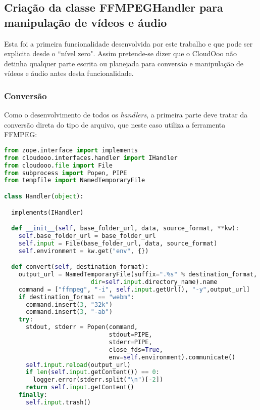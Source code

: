 \subsection{Criação da classe FFMPEGHandler para manipulação de vídeos e áudio}

Esta foi a primeira funcionalidade desenvolvida por este trabalho e que pode ser explicita desde o ``nível zero".
Assim pretende-se dizer que o CloudOoo não detinha qualquer parte escrita ou planejada para conversão e manipulação de vídeos e áudio antes desta funcionalidade.

\subsubsection{Conversão}

Como o desenvolvimento de todos os \textit{handlers}, a primeira parte deve tratar da conversão direta do tipo de arquivo, que neste caso utiliza a ferramenta FFMPEG:

{\singlespace
\begin{lstlisting}[caption=Conversão do FFMPEGHandler,language=python,label={ffhand}]
from zope.interface import implements
from cloudooo.interfaces.handler import IHandler
from cloudooo.file import File
from subprocess import Popen, PIPE
from tempfile import NamedTemporaryFile

class Handler(object):

  implements(IHandler)

  def __init__(self, base_folder_url, data, source_format, **kw):
    self.base_folder_url = base_folder_url
    self.input = File(base_folder_url, data, source_format)
    self.environment = kw.get("env", {})

  def convert(self, destination_format):
    output_url = NamedTemporaryFile(suffix=".%s" % destination_format,
                        dir=self.input.directory_name).name
    command = ["ffmpeg", "-i", self.input.getUrl(), "-y",output_url]
    if destination_format == "webm":
      command.insert(3, "32k")
      command.insert(3, "-ab")
    try:
      stdout, stderr = Popen(command,
                             stdout=PIPE,
                             stderr=PIPE,
                             close_fds=True,
                             env=self.environment).communicate()
      self.input.reload(output_url)
      if len(self.input.getContent()) == 0:
        logger.error(stderr.split("\n")[-2])
      return self.input.getContent()
    finally:
      self.input.trash()
\end{lstlisting}
}

